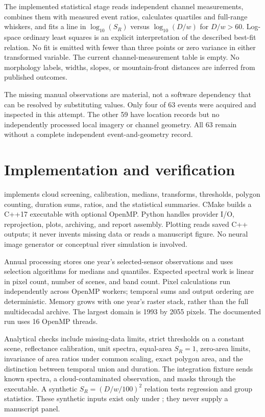 \documentclass[11pt]{article}
\newcommand{\artifact}[1]{\path{#1}}
\begin{document}
The implemented statistical stage reads independent channel measurements,
combines them with measured event ratios, calculates quartiles and full-range
whiskers, and fits a line in $\log_{10}(S_R)$ versus $\log_{10}(D/w)$ for
$D/w>60$. Log-space ordinary least squares is an explicit interpretation
of the described best-fit relation. No fit is emitted with fewer than three
points or zero variance in either transformed variable. The current channel-measurement table is
empty. No morphology labels, widths, slopes, or mountain-front distances are
inferred from published outcomes.

The missing manual observations are material, not a software dependency that
can be resolved by substituting values. Only four of 63 events were acquired
and inspected in this attempt. The other 59 have location records but no
independently processed local imagery or channel geometry. All 63 remain
without a complete independent event-and-geometry record.

\section{Implementation and verification}
\artifact{src/avulsion.cpp} implements cloud screening, calibration, medians,
transforms, thresholds, polygon counting, duration sums, ratios, and the
statistical summaries. CMake builds a C++17 executable with optional OpenMP.
Python handles provider I/O, reprojection, plots, archiving, and report
assembly. Plotting reads saved C++ outputs; it never invents missing data or
reads a manuscript figure. No neural image generator or conceptual river
simulation is involved.

Annual processing stores one year's selected-sensor observations and uses
selection algorithms for medians and quantiles. Expected spectral work is
linear in pixel count, number of scenes, and band count. Pixel calculations
run independently across OpenMP workers; temporal sums and output ordering
are deterministic. Memory grows with one year's raster stack, rather than
the full multidecadal archive. The largest domain is 1993 by 2055 pixels.
The documented run uses 16 OpenMP threads.

Analytical checks include missing-data limits, strict thresholds on a constant
scene, reflectance calibration, unit spectra, equal-area $S_R=1$, zero-area
limits, invariance of area ratios under common scaling, exact polygon area,
and the distinction between temporal union and duration. The integration
fixture sends known spectra, a cloud-contaminated observation, and masks
through the executable. A synthetic $S_R=(D/w/100)^2$ relation tests regression
and group statistics. These synthetic inputs exist only under
\artifact{.runtime/}; they never supply a manuscript panel.
\end{document}
